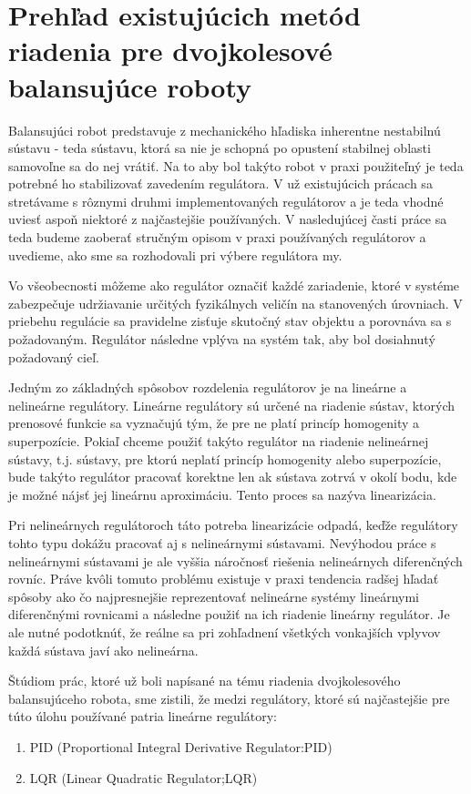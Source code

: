 \chapter{Prehľad existujúcich	metód riadenia pre	dvojkolesové balansujúce roboty}

Balansujúci robot predstavuje z mechanického hľadiska inherentne nestabilnú sústavu - teda sústavu, ktorá sa nie je schopná po opustení stabilnej oblasti samovoľne sa do nej vrátiť. Na to aby bol takýto robot v praxi použiteľný je teda potrebné ho stabilizovať zavedením regulátora. V už existujúcich prácach sa stretávame s rôznymi druhmi implementovaných regulátorov a je teda vhodné uviesť aspoň niektoré z najčastejšie používaných. V nasledujúcej časti práce sa teda budeme zaoberať  stručným opisom v praxi používaných regulátorov a uvedieme, ako sme sa rozhodovali pri výbere regulátora my.

Vo všeobecnosti môžeme ako regulátor označiť každé zariadenie, ktoré v systéme zabezpečuje udržiavanie určitých fyzikálnych veličín na stanovených úrovniach. V priebehu regulácie sa pravidelne zisťuje skutočný stav objektu a porovnáva sa s požadovaným.  Regulátor následne vplýva na systém tak, aby bol dosiahnutý požadovaný cieľ.

Jedným zo základných spôsobov rozdelenia regulátorov je na lineárne a nelineárne regulátory. Lineárne regulátory sú určené na riadenie sústav, ktorých prenosové funkcie sa vyznačujú tým, že pre ne platí princíp homogenity a superpozície. Pokiaľ chceme použiť takýto regulátor na riadenie nelineárnej sústavy, t.j. sústavy, pre ktorú neplatí princíp homogenity alebo superpozície, bude takýto regulátor pracovať korektne len ak sústava zotrvá v okolí bodu, kde je možné nájsť jej lineárnu aproximáciu. Tento proces sa nazýva linearizácia. 

Pri nelineárnych regulátoroch táto potreba linearizácie odpadá, keďže regulátory tohto typu dokážu pracovať aj s nelineárnymi sústavami. Nevýhodou práce s nelineárnymi sústavami je ale vyššia náročnosť riešenia nelineárnych diferenčných rovníc. Práve kvôli  tomuto problému existuje v praxi tendencia radšej hľadať spôsoby ako čo najpresnejšie reprezentovať nelineárne systémy lineárnymi diferenčnými rovnicami a následne použiť na ich riadenie lineárny regulátor. Je ale nutné podotknúť, že reálne sa pri zohľadnení všetkých vonkajších vplyvov každá sústava javí ako nelineárna. 

Štúdiom prác, ktoré už boli napísané na tému riadenia dvojkolesového balansujúceho robota, sme zistili, že medzi regulátory, ktoré sú najčastejšie pre túto úlohu používané patria lineárne regulátory:
\begin{enumerate}
\item \ac{PID} (Proportional Integral Derivative Regulator:PID)
\item \ac{LQR}  (Linear Quadratic Regulator;LQR)
\end{enumerate}

